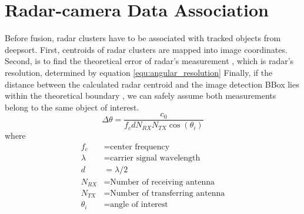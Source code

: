 \section{Radar-camera Data Association}\label{sec:2-association}
Before fusion, radar clusters have to be associated with tracked objects from deepsort.
First, centroids of radar clusters are mapped into image coordinates.
Second, is to find the theoretical error of radar's measurement \cite{8844649}, which is radar's resolution, determined by equation \ref*{equ:angular_resolution}
Finally, if the distance between the calculated radar centroid and the image detection BBox lies within the theoretical boundary
, we can safely assume both measurements belong to the same object of interest.
\begin{equation}\label{equ:angular_resolution}
    \Delta \theta= \frac{c_0}{f_c d N_{RX} N_{TX} \cos(\theta _i)}
\end{equation}
where
\begin{align*}
    f_c & = \text{center frequency} \\
    \lambda & = \text{carrier signal wavelength} \\
    d & =  \lambda/2 \\
    N_{RX} & = \text{Number of receiving antenna}\\
    N_{TX}& = \text{Number of transferring antenna}\\
    \theta _i &= \text{angle of interest}
\end{align*}






